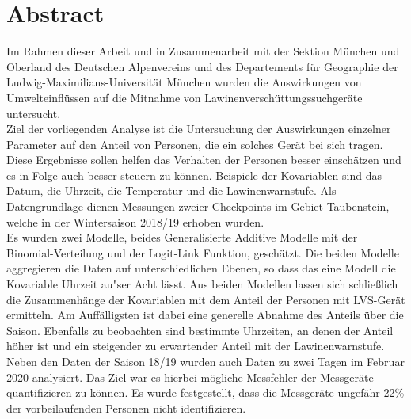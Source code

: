 \documentclass[12pt]{scrreprt}
\begin{document}
	
	
\vspace{5cm}		
\thispagestyle{empty}
		
	
	
\begingroup
	
	
\tableofcontents	
\newpage	
\listoffigures	
\listoftables	
\setcounter{page}{1}
\thispagestyle{empty}		
\endgroup
	
\newpage	
{}

\chapter*{Abstract}
\setcounter{page}{1}
Im Rahmen dieser Arbeit und in Zusammenarbeit mit der Sektion München und Oberland des Deutschen Alpenvereins und des Departements für Geographie der Ludwig-Maximilians-Universität München wurden die Auswirkungen von Umwelteinflüssen auf die Mitnahme von Lawinenverschüttungssuchgeräte untersucht. \\
Ziel der vorliegenden Analyse ist die Untersuchung der Auswirkungen einzelner Parameter auf den Anteil von Personen, die ein solches Gerät bei sich tragen. \\
Diese Ergebnisse sollen helfen das Verhalten der Personen besser einschätzen und es in Folge auch besser steuern zu können. Beispiele der Kovariablen sind das Datum, die Uhrzeit, die Temperatur und die Lawinenwarnstufe. Als Datengrundlage dienen Messungen zweier Checkpoints im Gebiet Taubenstein, welche in der Wintersaison 2018/19 erhoben wurden. \\
Es wurden zwei Modelle, beides Generalisierte Additive Modelle mit der Binomial-Verteilung und der Logit-Link Funktion, geschätzt. Die beiden Modelle aggregieren die Daten auf unterschiedlichen Ebenen, so dass das eine Modell die Kovariable Uhrzeit au"ser Acht lässt. Aus beiden Modellen lassen sich schließlich die Zusammenhänge der Kovariablen mit dem Anteil der Personen mit LVS-Gerät ermitteln. Am Auffälligsten ist dabei eine generelle Abnahme des Anteils über die Saison. Ebenfalls zu beobachten sind bestimmte Uhrzeiten, an denen der Anteil höher ist und ein steigender zu erwartender Anteil mit der Lawinenwarnstufe. \\
Neben den Daten der Saison 18/19 wurden auch Daten zu zwei Tagen im Februar 2020 analysiert. Das Ziel war es hierbei mögliche Messfehler der Messgeräte quantifizieren zu können. Es wurde festgestellt, dass die Messgeräte ungefähr 22\% der vorbeilaufenden Personen nicht identifizieren. \\
\end{document}
